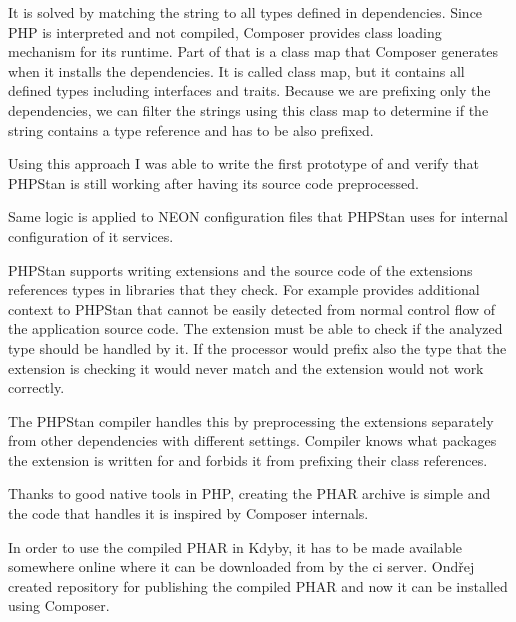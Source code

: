 It is solved by matching the string to all types defined in dependencies. Since PHP is interpreted and not compiled, Composer provides class loading mechanism for its runtime. Part of that is a class map that Composer generates when it installs the dependencies. It is called class map, but it contains all defined types including interfaces and traits. Because we are prefixing only the dependencies, we can filter the strings using this class map to determine if the string contains a type reference and has to be also prefixed.

Using this approach I was able to write the first prototype of  and verify that PHPStan is still working after having its source code preprocessed.

Same logic is applied to NEON configuration files that PHPStan uses for internal configuration of it services.

 \label{sec:refactoring:phpstan-extensions}

PHPStan supports writing extensions and the source code of the extensions references types in libraries that they check. For example  provides additional context to PHPStan that cannot be easily detected from normal control flow of the application source code. The extension must be able to check if the analyzed type should be handled by it. If the processor would prefix also the type that the extension is checking it would never match and the extension would not work correctly.

The PHPStan compiler handles this by preprocessing the extensions separately from other dependencies with different settings. Compiler knows what packages the extension is written for and forbids it from prefixing their class references.

 \label{sec:refactoring:phpstan-phar}

Thanks to good native tools in PHP, creating the PHAR archive is simple and the code that handles it is inspired by Composer internals.

 \label{sec:refactoring:phpstan-shim}

In order to use the compiled PHAR in Kdyby, it has to be made available somewhere online where it can be downloaded from by the \gls{ci} server. Ondřej created  repository for publishing the compiled PHAR and now it can be installed using Composer.

